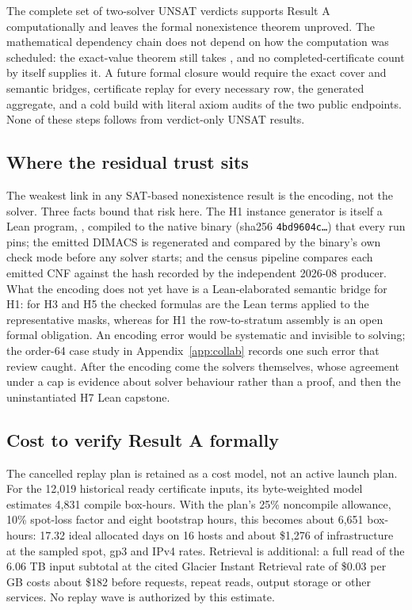 \documentclass{anvil-paper}
\newcommand{\hnoFortyNine}{\lean{hno49}}
\theoremstyle{definition}
\begin{document}
The complete set of two-solver UNSAT verdicts supports Result A computationally and leaves the formal nonexistence theorem unproved. The mathematical dependency chain does not depend on how the computation was scheduled: the exact-value theorem still takes \hnoFortyNine, and no completed-certificate count by itself supplies it. A future formal closure would require the exact cover and semantic bridges, certificate replay for every necessary row, the generated aggregate, and a cold build with literal axiom audits of the two public endpoints. None of these steps follows from verdict-only UNSAT results.

\subsection{Where the residual trust sits}\label{sec:trust}

The weakest link in any SAT-based nonexistence result is the encoding, not the solver. Three facts bound that risk here. The H1 instance generator is itself a Lean program, , compiled to the native  binary (sha256 \texttt{4bd9604c\ldots}) that every run pins; the emitted DIMACS is regenerated and compared by the binary's own check mode before any solver starts; and the census pipeline compares each emitted CNF against the hash recorded by the independent 2026-08 producer. What the encoding does not yet have is a Lean-elaborated semantic bridge for H1: for H3 and H5 the checked formulas are the Lean terms  applied to the representative masks, whereas for H1 the row-to-stratum assembly is an open formal obligation. An encoding error would be systematic and invisible to solving; the order-64 case study in Appendix~\ref{app:collab} records one such error that review caught. After the encoding come the solvers themselves, whose agreement under a cap is evidence about solver behaviour rather than a proof, and then the uninstantiated H7 Lean capstone.

\subsection{Cost to verify Result A formally}\label{sec:cost}

The cancelled replay plan is retained as a cost model, not an active launch plan. For the 12,019 historical ready certificate inputs, its byte-weighted model estimates 4,831 compile box-hours. With the plan's 25\% noncompile allowance, 10\% spot-loss factor and eight bootstrap hours, this becomes about 6,651 box-hours: 17.32 ideal allocated days on 16 hosts and about \$1,276 of infrastructure at the sampled spot, gp3 and IPv4 rates. Retrieval is additional: a full read of the 6.06 TB input subtotal at the cited Glacier Instant Retrieval rate of \$0.03 per GB costs about \$182 before requests, repeat reads, output storage or other services. No replay wave is authorized by this estimate.
\end{document}
